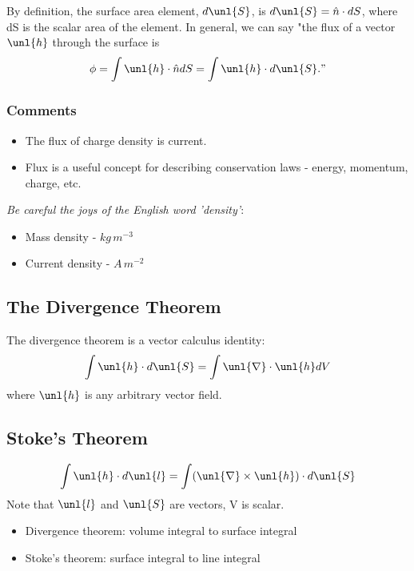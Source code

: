\documentclass[a4paper, 11pt, normalem]{report}
\newcommand\del{\unl{\nabla}}
\newcommand\hn{\hat{n}}
\begin{document}
By definition, the surface area element, $d\unl{S}$, is $d\unl{S} = \hn \cdot dS$, where dS is the scalar area of the element.
In general, we can say "the flux of a vector $\unl{h}$ through the surface is
\begin{equation*}
    \phi = \int \unl{h} \cdot \hn dS = \int \unl{h} \cdot d\unl{S}."
\end{equation*}

\subsubsection{Comments}
\begin{itemize}
    \item The flux of charge density is current.
    \item Flux is a useful concept for describing conservation laws - energy, momentum, charge, etc.
\end{itemize}
\emph{Be careful the joys of the English word 'density'}:
\begin{itemize}
    \item Mass density - $kg\,m^{-3}$
    \item Current density - $A\,m^{-2}$
\end{itemize}

\subsection{The Divergence Theorem}
The divergence theorem is a vector calculus identity:
\begin{equation*}
    \int \unl{h}\cdot d\unl{S} = \int \del \cdot \unl{h}dV
\end{equation*}
where $\unl{h}$ is any arbitrary vector field.

\subsection{Stoke's Theorem}
\begin{equation*}
    \int \unl{h}\cdot d\unl{l} = \int (\del \times \unl{h}) \cdot d\unl{S}
\end{equation*}
Note that $\unl{l}$ and $\unl{S}$ are vectors, V is scalar.
\begin{itemize}
    \item Divergence theorem: volume integral to surface integral
    \item Stoke's theorem: surface integral to line integral
\end{itemize}
\end{document}
